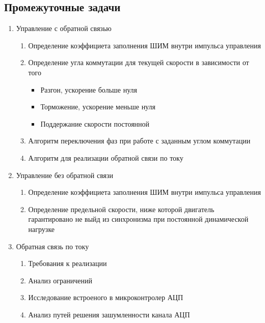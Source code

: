 \newpage
\subsection{Промежуточные задачи}

\begin{enumerate}
    \item{Управление с обратной связью}
    \begin{enumerate}
        \item Определение коэффициета заполнения ШИМ внутри импульса управления
        \item Определение угла коммутации для текущей скорости в зависимости от того
            \begin{itemize}
                \item Разгон, ускорение больше нуля
                \item Торможение, ускорение меньше нуля
                \item Поддержание скорости постоянной
            \end{itemize}
        \item Алгоритм переключения фаз при работе с заданным углом коммутации
        \item Алгоритм для реализации обратной связи по току
    \end{enumerate}

    \item{Управление без обратной связи}
        \begin{enumerate}
            \item Определение коэффициета заполнения ШИМ внутри импульса управления
            \item Определение предельной скорости, ниже которой двигатель гарантировано не выйд из
                синхронизма при постоянной динамической нагрузке
        \end{enumerate}

    \item{Обратная связь по току}
        \begin{enumerate}
            \item Требования к реализации
            \item Анализ ограничений
            \item Исследование встроеного в микроконтролер АЦП
            \item Анализ путей решения зашумленности канала АЦП
        \end{enumerate}


\end{enumerate}
